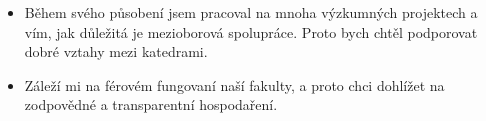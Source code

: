 \documentclass[12pt,a4paper]{article}
\begin{document}
{\begin{itemize}
            \item Během svého působení jsem pracoval na mnoha výzkumných projektech a vím, jak důležitá je mezioborová spolupráce. Proto bych chtěl podporovat dobré vztahy mezi katedrami.
            
            \item Záleží mi na férovém fungovaní naší fakulty, a proto chci  dohlížet na zodpovědné a transparentní hospodaření.
            
		
        \end{itemize}
        


    
}
\end{document}
